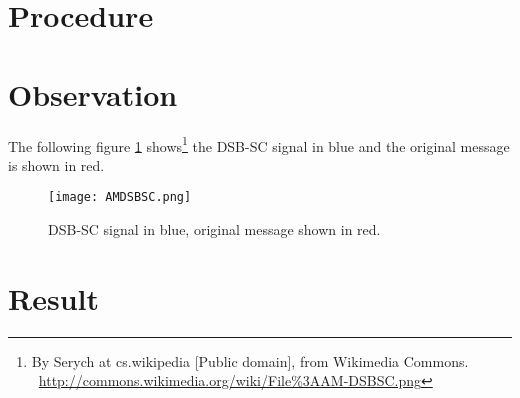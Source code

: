 \section*{Procedure}
\section*{Observation}

The following figure \ref{DSBSC} shows\footnote{By Serych at cs.wikipedia [Public domain], from Wikimedia Commons.  \ \url{http://commons.wikimedia.org/wiki/File\%3AAM-DSBSC.png}} the DSB-SC signal in blue and the original message is shown in red.
\begin{figure}[h]
\begin{center}
\texttt{[image: AMDSBSC.png]}
\caption{DSB-SC signal in blue, original message shown in red.}
\label{DSBSC}
\end{center}

\end{figure}


\section*{Result}
